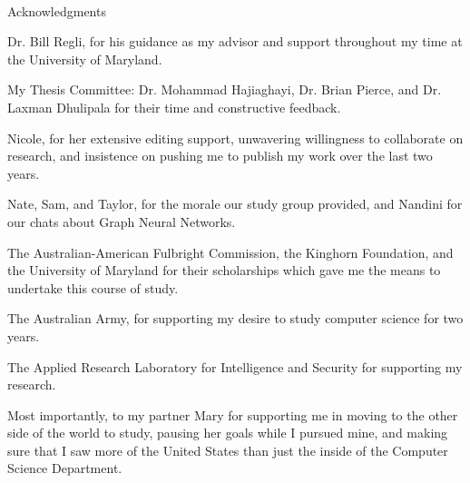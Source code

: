 
\renewcommand{\baselinestretch}{2}
\small\normalsize
\hbox{\ }
 
\vspace{.5in}

\begin{center}
\large{Acknowledgments} 
\end{center} 

\vspace{1ex}

\noindent Dr. Bill Regli, for his guidance as my advisor and support throughout my time at the University of Maryland. 

\noindent My Thesis Committee: Dr. Mohammad Hajiaghayi, Dr. Brian Pierce, and Dr. Laxman Dhulipala for their time and constructive feedback. 

\noindent Nicole, for her extensive editing support, unwavering willingness to collaborate on research, and insistence on pushing me to publish my work over the last two years.

\noindent Nate, Sam, and Taylor, for the morale our study group provided, and Nandini for our chats about Graph Neural Networks.

\noindent The Australian-American Fulbright Commission, the Kinghorn Foundation, and the University of Maryland for their scholarships which gave me the means to undertake this course of study. 

\noindent The Australian Army, for supporting my desire to study computer science for two years.

\noindent The Applied Research Laboratory for Intelligence and Security for supporting my research.

\noindent Most importantly, to my partner Mary for supporting me in moving to the other side of the world to study, pausing her goals while I pursued mine, and making sure that I saw more of the United States than just the inside of the Computer Science Department. 